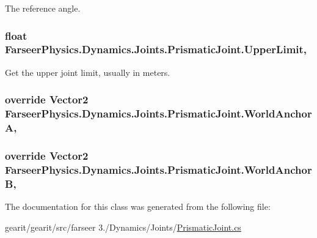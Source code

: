 The reference angle. 

\hypertarget{class_farseer_physics_1_1_dynamics_1_1_joints_1_1_prismatic_joint_a80eb4690a1e1f5dd77706368f1ed0de5}{
\subsubsection[{Upper\+Limit}]{\setlength{\rightskip}{0pt plus 5cm}float Farseer\+Physics.\+Dynamics.\+Joints.\+Prismatic\+Joint.\+Upper\+Limit\hspace{0.3cm}{\ttfamily [get]}, {\ttfamily [set]}}}\label{class_farseer_physics_1_1_dynamics_1_1_joints_1_1_prismatic_joint_a80eb4690a1e1f5dd77706368f1ed0de5}


Get the upper joint limit, usually in meters. 

\hypertarget{class_farseer_physics_1_1_dynamics_1_1_joints_1_1_prismatic_joint_a7e94a730d582ca7fc50c453b683000fb}{
\subsubsection[{World\+Anchor\+A}]{\setlength{\rightskip}{0pt plus 5cm}override Vector2 Farseer\+Physics.\+Dynamics.\+Joints.\+Prismatic\+Joint.\+World\+Anchor\+A\hspace{0.3cm}{\ttfamily [get]}, {\ttfamily [set]}}}\label{class_farseer_physics_1_1_dynamics_1_1_joints_1_1_prismatic_joint_a7e94a730d582ca7fc50c453b683000fb}
\hypertarget{class_farseer_physics_1_1_dynamics_1_1_joints_1_1_prismatic_joint_ac4c9e37aaca70be7d56acd3e33477ad4}{
\subsubsection[{World\+Anchor\+B}]{\setlength{\rightskip}{0pt plus 5cm}override Vector2 Farseer\+Physics.\+Dynamics.\+Joints.\+Prismatic\+Joint.\+World\+Anchor\+B\hspace{0.3cm}{\ttfamily [get]}, {\ttfamily [set]}}}\label{class_farseer_physics_1_1_dynamics_1_1_joints_1_1_prismatic_joint_ac4c9e37aaca70be7d56acd3e33477ad4}


The documentation for this class was generated from the following file\+:\begin{DoxyCompactItemize}
\item 
gearit/gearit/src/farseer 3./\+Dynamics/\+Joints/\hyperlink{_prismatic_joint_8cs}{Prismatic\+Joint.\+cs}\end{DoxyCompactItemize}
